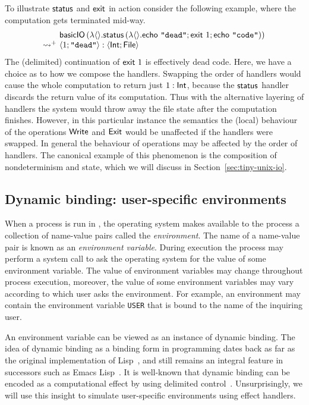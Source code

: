 \documentclass[12pt,phd,lfcs,twoside,openright,logo,leftchapter,normalheadings]{infthesis}
\theoremstyle{plain}
\theoremstyle{definition}
\begin{document}
To illustrate $\mathsf{status}$ and $\mathsf{exit}$ in action consider the following
example, where the computation gets terminated mid-way.
%
\[
  \ba{@{~}l@{~}l}
    &\bl
      \basicIO\,(\lambda\Unit.
         \status\,(\lambda\Unit.
            \echo~\strlit{dead};\exit~1;\echo~\strlit{code}))
     \el\\
    \reducesto^+& \Record{1;\strlit{dead}} : \Record{\Int;\UFile}
  \ea
\]
%
The (delimited) continuation of $\mathsf{exit}~1$ is effectively dead code.
%
Here, we have a choice as to how we compose the handlers. Swapping the
order of handlers would cause the whole computation to return just
$1 : \mathsf{Int}$, because the $\mathsf{status}$ handler discards the return value of
its computation. Thus with the alternative layering of handlers the
system would throw away the file state after the computation
finishes. However, in this particular instance the semantics the
(local) behaviour of the operations $\mathsf{Write}$ and $\mathsf{Exit}$ would be
unaffected if the handlers were swapped. In general the behaviour of
operations may be affected by the order of handlers. The canonical
example of this phenomenon is the composition of nondeterminism and
state, which we will discuss in Section~\ref{sec:tiny-unix-io}.

\subsection{Dynamic binding: user-specific environments}
\label{sec:tiny-unix-env}

When a process is run in \UNIX{}, the operating system makes available
to the process a collection of name-value pairs called the
\emph{environment}.
%
The name of a name-value pair is known as an \emph{environment
  variable}.
%
During execution the process may perform a system call to ask the
operating system for the value of some environment variable.
%
The value of environment variables may change throughout process
execution, moreover, the value of some environment variables may vary
according to which user asks the environment.
%
For example, an environment may contain the environment variable
\texttt{USER} that is bound to the name of the inquiring user.

An environment variable can be viewed as an instance of dynamic
binding. The idea of dynamic binding as a binding form in programming
dates back as far as the original implementation of
Lisp~\cite{McCarthy60}, and still remains an integral feature in
successors such as Emacs Lisp~\cite{LewisLSG20}. It is well-known that
dynamic binding can be encoded as a computational effect by using
delimited control~\cite{KiselyovSS06}.
%
Unsurprisingly, we will use this insight to simulate user-specific
environments using effect handlers.
\end{document}
